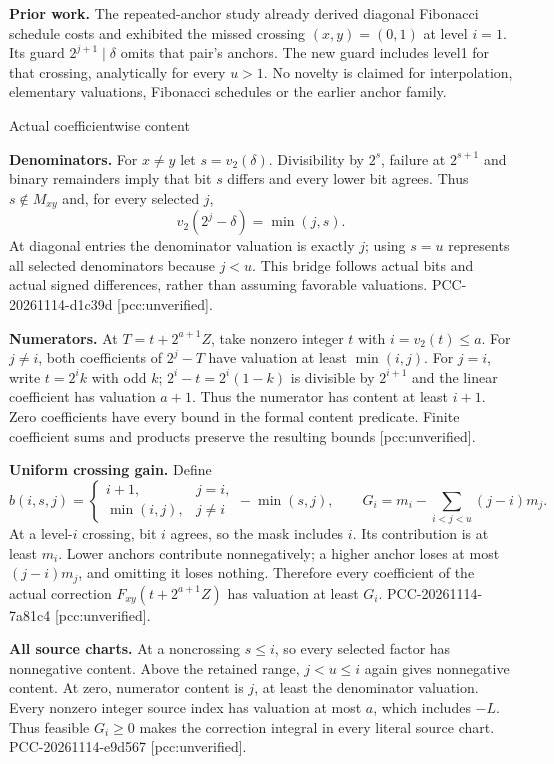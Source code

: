 \documentclass[10pt]{article}
\begin{document}
\textbf{Prior work.} The repeated-anchor study already derived diagonal
Fibonacci schedule costs and exhibited the missed crossing $(x,y)=(0,1)$ at
level $i=1$. Its guard $2^{j+1}\mid\delta$ omits that pair's anchors.
The new guard includes level1 for that crossing, analytically for every
$u>1$. No novelty is claimed for interpolation, elementary valuations,
Fibonacci schedules or the earlier anchor family.

\newpage
\begin{center}{\Large Actual coefficientwise content}\end{center}

\textbf{Denominators.} For $x\ne y$ let $s=v_2(\delta)$. Divisibility by
$2^s$, failure at $2^{s+1}$ and binary remainders imply that bit $s$ differs
and every lower bit agrees. Thus $s\notin M_{xy}$ and, for every selected
$j$,
\[
 v_2(2^j-\delta)=\min(j,s).
\]
At diagonal entries the denominator valuation is exactly $j$; using $s=u$
represents all selected denominators because $j<u$.
This bridge follows actual bits and actual signed differences, rather than
assuming favorable valuations. PCC-20261114-d1c39d [pcc:unverified].

\textbf{Numerators.} At $T=t+2^{a+1}Z$, take nonzero integer $t$ with
$i=v_2(t)\le a$. For $j\ne i$, both coefficients of $2^j-T$ have valuation
at least $\min(i,j)$. For $j=i$, write $t=2^i k$ with odd $k$;
$2^i-t=2^i(1-k)$ is divisible by $2^{i+1}$ and the linear coefficient has
valuation $a+1$. Thus the numerator has content at least $i+1$.
Zero coefficients have every bound in the formal content predicate.
Finite coefficient sums and products preserve the resulting bounds
[pcc:unverified].

\textbf{Uniform crossing gain.} Define
\[
 b(i,s,j)=
 \begin{cases}i+1,&j=i,\\\min(i,j),&j\ne i\end{cases}
 -\min(s,j),\qquad
 G_i=m_i-\sum_{i<j<u}(j-i)m_j.
\]
At a level-$i$ crossing, bit $i$ agrees, so the mask includes $i$.
Its contribution is at least $m_i$. Lower anchors contribute
nonnegatively; a higher anchor loses at most $(j-i)m_j$, and omitting it
loses nothing. Therefore every coefficient of the actual correction
$F_{xy}(t+2^{a+1}Z)$ has valuation at least $G_i$.
PCC-20261114-7a81c4 [pcc:unverified].

\textbf{All source charts.} At a noncrossing $s\le i$, so every selected
factor has nonnegative content. Above the retained range, $j<u\le i$
again gives nonnegative content. At zero, numerator content is $j$,
at least the denominator valuation. Every nonzero integer source index
has valuation at most $a$, which includes $-L$. Thus feasible $G_i\ge0$
makes the correction integral in every literal source chart.
PCC-20261114-e9d567 [pcc:unverified].
\end{document}
